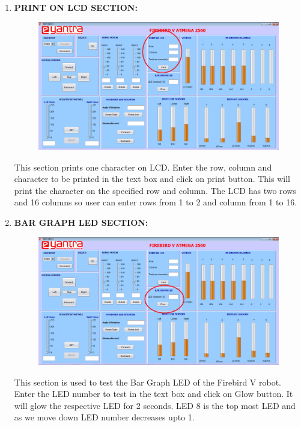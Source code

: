 \documentclass{article}
\begin{document}
\begin{enumerate}
		\item \textbf{PRINT ON LCD SECTION:} \\
		\begin{figure}[h]
			\begin{center}
				\includegraphics[scale=0.4]{printLCD.png}
			\end{center}
		\end{figure}
		This section prints one character on LCD. Enter the row, column and character to be printed in the text box and click on print button. This will print the character on the specified row and column. The LCD has two rows and 16 columns so user can enter rows from 1 to 2 and column from 1 to 16.
		\newpage
		\item \textbf{BAR GRAPH LED SECTION:} \\
		\begin{figure}[h]
			\begin{center}
				\includegraphics[scale=0.4]{BarLED.png}
			\end{center}
		\end{figure}
		This section is used to test the Bar Graph LED of the Firebird V robot. Enter the LED number to test in the text box and click on Glow button. It will glow the respective LED for 2 seconds. LED 8 is the top most LED and as we move down LED number decreases upto 1.

\end{enumerate}
\end{document}
